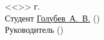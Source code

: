 \pagestyle{empty}
\vspace{\fill}
\noindent<<\underline{\hspace{1cm}}>> \underline{\hspace{5cm}} \the\year г.\\
Студент \hspace{1cm} \underline{Голубев~А.~В.\hspace{3.2cm}} \hspace{2cm} (\underline{\hspace{5cm}})\\
Руководитель \underline{\hspace{6.1cm}} \hspace{2cm} (\underline{\hspace{5cm}})\\